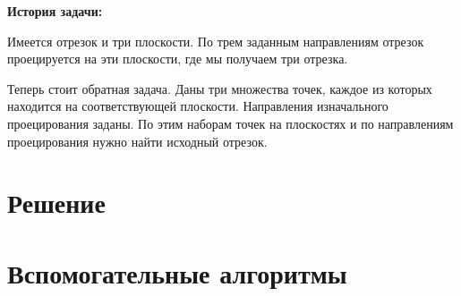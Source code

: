 \documentclass[article,final,14pt]{scrreprt}
\begin{document}
\textbf{История задачи:}

Имеется отрезок и три плоскости. По трем заданным направлениям отрезок проецируется на эти плоскости, где мы получаем три отрезка.

Теперь стоит обратная задача. Даны три множества точек, каждое из которых находится на соответствующей плоскости. Направления изначального проецирования заданы. По этим наборам точек на плоскостях и по направлениям проецирования нужно найти исходный отрезок.

\newpage
\chapter{Решение}




% 



\chapter{Вспомогательные алгоритмы}\label{algs}





% 


\end{document}
